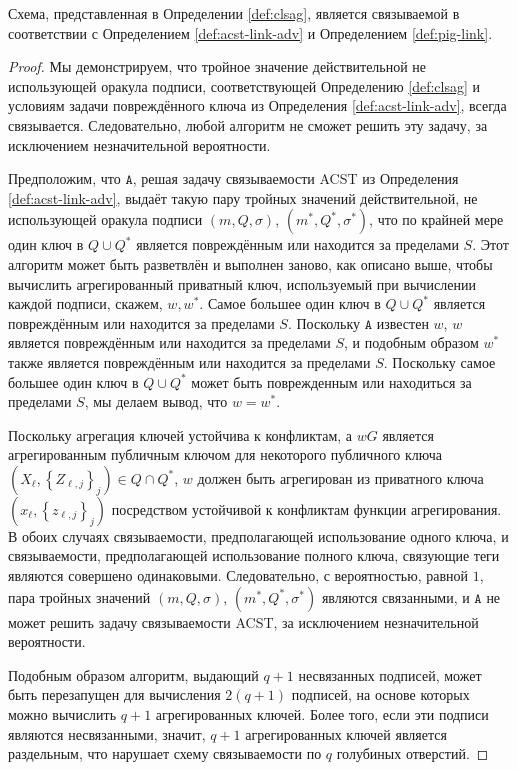 \documentclass{llncs}
\newcommand{\A}{\texttt{A}}
\begin{document}
\begin{theorem}\label{thm:linkabilty}
Схема, представленная в Определении \ref{def:clsag}, является связываемой в соответствии с Определением \ref{def:acst-link-adv} и Определением \ref{def:pig-link}.
\end{theorem}

\begin{proof}
Мы демонстрируем, что тройное значение действительной не использующей оракула подписи, соответствующей Определению \ref{def:clsag} и условиям задачи повреждённого ключа из Определения \ref{def:acst-link-adv}, всегда связывается. Следовательно, любой алгоритм не сможет решить эту задачу, за исключением незначительной вероятности.

Предположим, что $\A$, решая задачу связываемости ACST из Определения \ref{def:acst-link-adv}, выдаёт такую пару тройных значений действительной, не использующей оракула подписи $(m, Q, \sigma)$, $(m^*, Q^*, \sigma^*)$, что по крайней мере один ключ в $Q \cup Q^*$ является повреждённым или находится за пределами $S$. Этот алгоритм может быть разветвлён  и выполнен заново, как описано выше, чтобы вычислить агрегированный приватный ключ, используемый при вычислении каждой подписи, скажем, $w, w^*$. Самое большее один ключ в $Q \cup Q^*$ является повреждённым или находится за пределами $S$. Поскольку $\A$ известен $w$, $w$ является повреждённым или находится за пределами $S$, и подобным образом $w^*$ также является повреждённым или находится за пределами $S$. Поскольку самое большее один ключ в $Q \cup Q^*$ может быть поврежденным или находиться за пределами $S$, мы делаем вывод, что $w = w^*$.

Поскольку агрегация ключей устойчива к конфликтам, а $wG$ является агрегированным публичным ключом для некоторого публичного ключа $(X_\ell, \left\{Z_{\ell, j}\right\}_j) \in Q \cap Q^*$, $w$ должен быть агрегирован из приватного ключа $(x_\ell, \left\{z_{\ell, j}\right\}_j)$ посредством устойчивой к конфликтам функции агрегирования. В обоих случаях связываемости, предполагающей использование одного ключа, и связываемости, предполагающей использование полного ключа, связующие теги являются совершено одинаковыми. Следовательно, с вероятностью, равной $1$, пара тройных значений $(m, Q, \sigma)$, $(m^*, Q^*, \sigma^*)$ являются связанными, и $\A$ не может решить задачу связываемости ACST, за исключением незначительной вероятности.

Подобным образом алгоритм, выдающий $q+1$ несвязанных подписей, может быть перезапущен для вычисления $2(q+1)$ подписей, на основе которых можно вычислить $q+1$ агрегированных ключей. Более того, если эти подписи являются несвязанными, значит, $q+1$ агрегированных ключей является раздельным, что нарушает схему связываемости по $q$ голубиных отверстий.
\end{proof}
\end{document}
